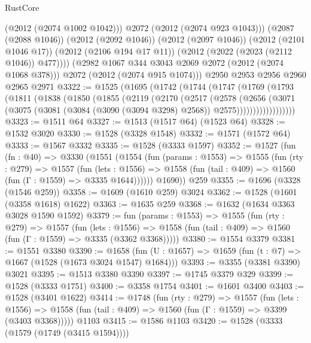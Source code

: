 \begin{lexlean}{RustCore}
\begin{coremodule}
              (@2012 (@2074 @1002 @1042)))
            @2072
            (@2012 (@2074 @923 @1043)))
          (@2087 (@2088 @1046))
          (@2012 (@2092 @1046))
          (@2012 (@2097 @1046))
          (@2012 (@2101 @1046 @17))
          (@2012 (@2106 @194 @17 @11))
          (@2012 (@2022 (@2023 (@2112 @1046)) @477))))
      (@2982 @1067 @344 @3043 @2069 @2072 (@2012 (@2074 @1068 @378)))
      @2072
      (@2012 (@2074 @915 @1074)))
    @2950
    @2953
    @2956
    @2960
    @2965
    @2971
@3322 := @1525
    (@1695
      (@1742
        (@1744
          (@1747
            (@1769
              (@1793
                (@1811
                  (@1838
                    (@1850
                      (@1855
                        (@2119
                          (@2170
                            (@2517
                              (@2578
                                (@2656
                                  (@3071
                                    (@3075
                                      (@3081
                                        (@3084 (@3090 (@3094 @3298) @2568))
                                        @2575))))))))))))))))))
@3323 := @1511 @64
@3327 := @1513 (@1517 @64) (@1523 @64)
@3328 := @1532 @3020
@3330 := @1528 (@3328 @1548)
@3332 := @1571 (@1572 @64)
@3333 := @1567 @3332
@3335 := @1528 (@3333 @1597)
@3352 := @1527
    (fun (fn : @40) =>
    @3330
      (@1551
        (@1554
          (fun (params : @1553) =>
          @1555
            (fun (rty : @279) =>
            @1557
              (fun (lets : @1556) =>
              @1558 (fun (tail : @409) => @1560 (fun (Γ : @1559) => @3335 @1644))))))
        @1690))
    @259
@3355 := @1696 (@3328 (@1546 @259))
@3358 := @1609 (@1610 @259) @3024
@3362 := @1528 (@1601 (@3358 @1618) @1622)
@3363 := @1635 @259
@3368 := @1632 (@1634 @3363 @3028 @1590 @1592)
@3379 := fun (params : @1553) =>
  @1555
    (fun (rty : @279) =>
    @1557
      (fun (lets : @1556) =>
      @1558 (fun (tail : @409) => @1560 (fun (Γ : @1559) => @3335 (@3362 @3368)))))
@3380 := @1554 @3379
@3381 := @1551 @3380
@3390 := @1658 (fun (U : @1657) => @1659 (fun (t : @7) => @1667 (@1528 (@1673 @3024 @1547) @1684)))
@3393 := @3355 (@3381 @3390) @3021
@3395 := @1513 @3380 @3390
@3397 := @1745 @3379 @329
@3399 := @1528 (@3333 @1751)
@3400 := @3358 @1754
@3401 := @1601 @3400
@3403 := @1528 (@3401 @1622)
@3414 := @1748
    (fun (rty : @279) =>
    @1557
      (fun (lets : @1556) =>
      @1558 (fun (tail : @409) => @1560 (fun (Γ : @1559) => @3399 (@3403 @3368)))))
    @1103
@3415 := @1586 @1103
@3420 := @1528 (@3333 (@1579 (@1749 (@3415 @1594))))

\end{coremodule}
\end{lexlean}
